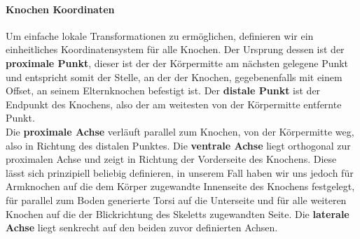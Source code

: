 \paragraph{Knochen Koordinaten}
Um einfache lokale Transformationen zu ermöglichen, definieren wir ein einheitliches Koordinatensystem für alle Knochen. Der Ursprung dessen ist der \textbf{proximale Punkt}, dieser ist der der Körpermitte am nächsten gelegene Punkt und entspricht somit der Stelle, an der der Knochen, gegebenenfalls mit einem Offset, an seinem Elternknochen befestigt ist. Der \textbf{distale Punkt} ist der Endpunkt des Knochens, also der am weitesten von der Körpermitte entfernte Punkt. \\ Die \textbf{proximale Achse} verläuft parallel zum Knochen, von der Körpermitte weg, also in Richtung des distalen Punktes. Die \textbf{ventrale Achse} liegt orthogonal zur proximalen Achse und zeigt in Richtung der Vorderseite des Knochens. Diese lässt sich prinzipiell beliebig definieren, in unserem Fall haben wir uns jedoch für Armknochen auf die dem Körper zugewandte Innenseite des Knochens festgelegt, für parallel zum Boden generierte Torsi auf die Unterseite und für alle weiteren Knochen auf die der Blickrichtung des Skeletts zugewandten Seite. Die \textbf{laterale Achse} liegt senkrecht auf den beiden zuvor definierten Achsen.

